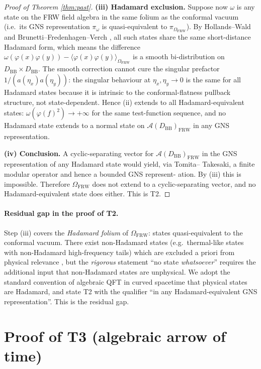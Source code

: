 \documentclass[11pt]{article}
\theoremstyle{definition}
\renewcommand{\AA}{\mathcal{A}}
\newcommand{\BB}{\mathrm{BB}}
\newcommand{\FRW}{\mathrm{FRW}}
\begin{document}
\begin{proof}[Proof of Theorem \ref{thm:past}]
\textbf{(iii) Hadamard exclusion.} Suppose now $\omega$ is any state on
the FRW field algebra in the same folium as the conformal vacuum (i.e.\
its GNS representation $\pi_\omega$ is quasi-equivalent to $\pi_{\Omega_\FRW}$).
By Hollands--Wald \cite{HollandsWald2001} and Brunetti--Fredenhagen--Verch
\cite{BrunettiFredenhagenVerch2003}, all such states share the same
short-distance Hadamard form, which means the difference
$\omega(\varphi(x)\varphi(y))-\langle\varphi(x)\varphi(y)\rangle_{\Omega_\FRW}$
is a smooth bi-distribution on $D_\BB\times D_\BB$. The smooth correction
cannot cure the singular prefactor $1/(a(\eta_x)a(\eta_y))$: the singular
behaviour at $\eta_x,\eta_y\to 0$ is the same for all Hadamard states
because it is intrinsic to the conformal-flatness pullback structure,
not state-dependent. Hence (ii) extends to all Hadamard-equivalent
states: $\omega(\varphi(f)^2)\to+\infty$ for the same test-function
sequence, and no Hadamard state extends to a normal state on
$\AA(D_\BB)_\FRW$ in any GNS representation.

\textbf{(iv) Conclusion.} A cyclic-separating vector for $\AA(D_\BB)_\FRW$
in the GNS representation of any Hadamard state would yield, via Tomita--
Takesaki, a finite modular operator and hence a bounded GNS represent-
ation. By (iii) this is impossible. Therefore $\Omega_\FRW$ does not
extend to a cyclic-separating vector, and no Hadamard-equivalent state
does either. This is T2.
\end{proof}

\paragraph{Residual gap in the proof of T2.} Step (iii) covers the
\emph{Hadamard folium} of $\Omega_\FRW$: states quasi-equivalent to the
conformal vacuum. There exist non-Hadamard states (e.g.\ thermal-like
states with non-Hadamard high-frequency tails) which are excluded a
priori from physical relevance \cite{HollandsWald2001,
BrunettiFredenhagenVerch2003}, but the \emph{rigorous} statement
``no state \emph{whatsoever}'' requires the additional input that
non-Hadamard states are unphysical. We adopt the standard convention of
algebraic QFT in curved spacetime \cite{HollandsWald2001} that physical
states are Hadamard, and state T2 with the qualifier ``in any
Hadamard-equivalent GNS representation''. This is the residual gap.

\section{Proof of T3 (algebraic arrow of time)}
\end{document}
